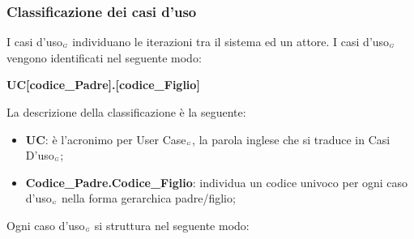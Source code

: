 \subsubsection{Classificazione dei casi d'uso}\label{ProcessiPrimariProspettiveAnalisiDeiRequisitiClassificazioneDeiCasiDuso}
I casi d'uso$_{\scaleto{G}{3pt}}$ individuano le iterazioni tra il sistema ed un attore. I casi d'uso$_{\scaleto{G}{3pt}}$ vengono identificati nel seguente modo:
\begin{center}
	\textbf{UC[codice\_Padre].[codice\_Figlio]}
\end{center}
La descrizione della classificazione è la seguente:
\begin{itemize}
	\item \textbf{UC}: è l'acronimo per User Case$_{\scaleto{G}{3pt}}$, la parola inglese che si traduce in Casi D'uso$_{\scaleto{G}{3pt}}$;
	\item \textbf{Codice\_Padre.Codice\_Figlio}: individua un codice univoco per ogni caso d'uso$_{\scaleto{G}{3pt}}$ nella forma gerarchica padre/figlio;
\end{itemize}
Ogni caso d'uso$_{\scaleto{G}{3pt}}$ si struttura nel seguente modo:
